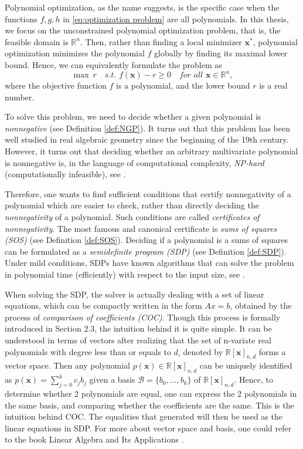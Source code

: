 \documentclass[12pt]{amsart}
\numberwithin{equation}{section}
\theoremstyle{definition}
\numberwithin{thm}{section}
\begin{document}
Polynomial optimization, as the name suggests, is the specific case when the functions $f, g, h$ in \eqref{eq:optimization problem} are all polynomials.
In this thesis, we focus on the unconstrained polynomial optimization problem, that is, the feasible domain is $\mathbb{R}^n$.
Then, rather than finding a local minimizer $\mathbf{x}^*$, polynomial optimization minimizes the polynomial $f$ globally by finding its maximal lower bound.
Hence, we can equivalently formulate the problem as 
\begin{equation*}
     \max \ r \quad \textit{s.t. } f(\mathbf{x}) - r \geq 0 \quad \textit{for all } \mathbf{x} \in \mathbb{R}^n,
 \end{equation*}
where the objective function $f$ is a polynomial, and the lower bound $r$ is a real number. 

To solve this problem, we need to decide whether a given polynomial is \emph{nonnegative} (see Definition \ref{def:NGP}).
It turns out that this problem has been well studied in real algebraic geometry since the beginning of the 19th century. 
However, it turns out that deciding whether an arbitrary multivariate polynomial is nonnegative is,
in the language of computational complexity, \emph{NP-hard} (computationally infeasible), see \cite[Chapter 3]{Blekherman:Parrilo:Thomas}.

Therefore, one wants to find sufficient conditions that certify nonnegativity of a polynomial which are easier to check, 
rather than directly deciding the \emph{nonnegativity} of a polynomial. 
Such conditions are called \emph{certificates of nonnegativity}.
The most famous and canonical certificate is \emph{sums of squares (SOS)} (see Definition \ref{def:SOS}).
Deciding if a polynomial is a sums of squares can be formulated as a \emph{semidefinite program (SDP)} (see Definition \ref{def:SDP}).
Under mild conditions, SDPs have known algorithms that can solve the problem in polynomial time (efficiently) with respect to the input size, see \cite[Chapter~2]{Blekherman:Parrilo:Thomas}.

When solving the SDP, the solver is actually dealing with a set of linear equations, which can be compactly written in the form $Ax = b$, obtained by the process of \emph{comparison of coefficients (COC)}.
Though this process is formally introduced in Section 2.3, the intuition behind it is quite simple. 
It can be understood in terms of vectors after realizing that the set of n-variate real polynomials with degree less than or equals to $d$, denoted by $\mathbb{R}[\mathbf{x}]_{n, d}$ forms a vector space.
Then any polynomial $p(\mathbf{x}) \in \mathbb{R}[\mathbf{x}]_{n, d}$ can be uniquely identified as $p(\mathbf{x}) = \sum_{j = 0}^k c_j b_j$ given a basis $\mathcal{B} = \{b_0, ..., b_k\}$ of $\mathbb{R}[\mathbf{x}]_{n, d}$.
Hence, to determine whether 2 polynomials are equal, one can express the 2 polynomials in the same basis, 
and comparing whether the coefficients are the same. This is the intuition behind COC. 
The equalities that generated will then be used as the linear equations in SDP.
For more about vector space and basis, one could refer to the book Linear Algebra and Its Applications \cite{Lay_David2014-12-24}.
\end{document}
